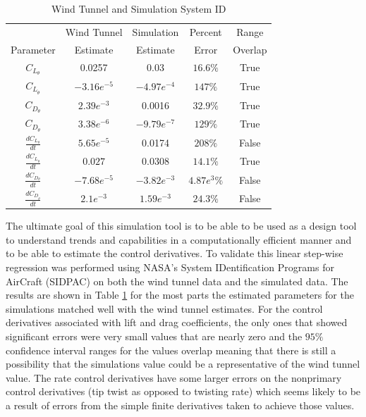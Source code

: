 \documentclass[11pt]{ucthesis}
\begin{document}
\begin{table}[h]
\begin{center}
\caption{Wind Tunnel and Simulation System ID}
\label{tab:WTSystemID}
\begin{tabular}{ c|c|c|c|c}
&Wind Tunnel&Simulation&Percent&Range\\
Parameter&Estimate&Estimate&Error& Overlap\\\hline
$C_{L_{\theta}}$&0.0257&0.03&$16.6\%$&True\\
$C_{L_{\dot{\theta}}}$&$-3.16e^{-5}$&$-4.97e^{-4}$&$147\%$&True\\
$C_{D_{\theta}}$&$2.39e^{-3}$&0.0016&$32.9\%$&True\\
$C_{D_{\dot{\theta}}}$&$3.38e^{-6}$&$-9.79e^{-7}$&$129\%$&True\\
$\frac{dC_{L_{\theta}}}{dt}$&$5.65e^{-5}$&0.0174&$208\%$&False\\
$\frac{dC_{L_{\dot{\theta}}}}{dt}$&$0.027$&$0.0308$&$14.1\%$&True\\
$\frac{dC_{D_{\theta}}}{dt}$&$-7.68e^{-5}$&$-3.82e^{-3}$&$4.87e^3\%$&False\\
$\frac{dC_{D_{\dot{\theta}}}}{dt}$&$2.1e^{-3}$&$1.59e^{-3}$&$24.3\%$&False\\
\end{tabular}
\end{center}
\end{table}  

The ultimate goal of this simulation tool is to be able to be used as a design tool to understand trends and capabilities in a computationally efficient manner and to be able to estimate the control derivatives. To validate this linear step-wise regression was performed using NASA's System IDentification Programs for AirCraft (SIDPAC) \cite{klein2006aircraft} on both the wind tunnel data and the simulated data. The results are shown in Table \ref{tab:WTSystemID} for the most parts the estimated parameters for the simulations matched well with the wind tunnel estimates. For the control derivatives associated with lift and drag coefficients, the only ones that showed significant errors were very small values that are nearly zero and the $95\%$ confidence interval ranges for the values overlap meaning that there is still a possibility that the simulations value could be a representative of the wind tunnel value. The rate control derivatives have some larger errors on the nonprimary control derivatives (tip twist as opposed to twisting rate) which seems likely to be a result of errors from the simple finite derivatives taken to achieve those values.
\end{document}
